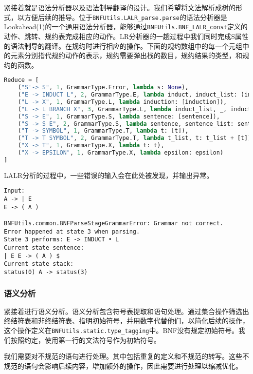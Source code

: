 紧接着就是语法分析器以及语法制导翻译的设计。我们希望将文法解析成树的形式，以方便后续的推导。位于\texttt{BNFUtils.LALR\_parse.parse}的语法分析器是Lookahead(1)的一个通用语法分析器，能够通过\texttt{BNFUtils.BNF\_LALR\_const}定义的动作、跳转、规约表完成相应的动作。LR分析器的一趟过程中我们同时完成S属性的语法制导的翻译。在规约时进行相应的操作。下面的规约数组中的每一个元组中的元素分别指代规约动作的表示，规约需要弹出栈的数目，规约结果的类型，和规约的函数。

\begin{lstlisting}[caption=规约数组，\texttt{BNFUtils.BNF\_LALR\_const},language=python]
Reduce = [
    ("S'-> S", 1, GrammarType.Error, lambda s: None),
    ("E -> INDUCT L", 2, GrammarType.E, lambda induct, induct_list: (induct, induct_list)),
    ("L -> X", 1, GrammarType.L, lambda induction: [induction]),
    ("L -> L BRANCH X", 3, GrammarType.L, lambda induct_list, _, induction: induct_list + [induction]),
    ("S -> E", 1, GrammarType.S, lambda sentence: [sentence]),
    ("S -> S E", 2, GrammarType.S, lambda sentence, sentence_list: sentence + [sentence_list]),
    ("T -> SYMBOL", 1, GrammarType.T, lambda t: [t]),
    ("T -> T SYMBOL", 2, GrammarType.T, lambda t_list, t: t_list + [t]),
    ("X -> T", 1, GrammarType.X, lambda t: t),
    ("X -> EPSILON", 1, GrammarType.X, lambda epsilon: epsilon)
]
\end{lstlisting}

LALR分析的过程中，一些错误的输入会在此处被发现，并输出异常。

\begin{lstlisting}[caption=语法分析阶段异常输入示例]
Input:
A -> | E
E -> ( A )

BNFUtils.common.BNFParseStageGrammarError: Grammar not correct.
Error happened at state 3 when parsing.
State 3 performs: E -> INDUCT • L
Current state sentence:
| E E -> ( A ) $
Current state stack:
status(0) A -> status(3)
\end{lstlisting}

\subsubsection*{语义分析}

紧接着进行语义分析。语义分析包含符号表提取和语句处理。通过集合操作筛选出终结符表和非终结符表、指明初始符号，并用数字代替他们，以简化后续的操作，这个操作定义在\texttt{BNFUtils.static.type\_tagging}中。BNF没有规定初始符号。我们按照约定，使用第一行的文法符号作为初始符号。

我们需要对不规范的语句进行处理。其中包括重复的定义和不规范的转写。这些不规范的语句会影响后续内容，增加额外的操作，因此需要进行处理以缩减优化。

